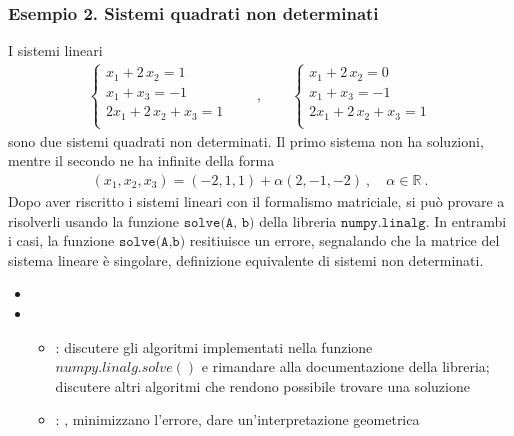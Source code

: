 \documentclass[letterpaper,10pt,english]{jupyterBook}
\begin{document}
\subsubsection{Esempio 2. Sistemi quadrati non determinati}
\label{\detokenize{ch/numerics/linear:esempio-2-sistemi-quadrati-non-determinati}}
\sphinxAtStartPar
I sistemi lineari
\begin{equation*}
\begin{split}\begin{cases}
  x_1 + 2 \, x_2 = 1 \\
  x_1 + x_3 = -1 \\
  2 x_1 + 2 \, x_2 + x_3 = 1 \\
\end{cases}
\qquad , \qquad
\begin{cases}
  x_1 + 2 \, x_2 = 0 \\
  x_1 + x_3 = -1 \\
  2 x_1 + 2 \, x_2 + x_3 = 1 \\
\end{cases}\end{split}
\end{equation*}
\sphinxAtStartPar
sono due sistemi quadrati non determinati. Il primo sistema non ha soluzioni, mentre il secondo ne ha infinite della forma
\begin{equation*}
\begin{split}(x_1, x_2, x_3) = (-2, 1, 1) + \alpha (2, -1, -2) \ , \quad \alpha \in \mathbb{R} \ .\end{split}
\end{equation*}
\sphinxAtStartPar
Dopo aver riscritto i sistemi lineari con il formalismo matriciale, si può provare a risolverli usando la funzione \(\texttt{solve(A, b)}\) della libreria \(\texttt{numpy.linalg}\). In entrambi i casi, la funzione \(\texttt{solve(A,b)}\) resitiuisce un errore, segnalando che la matrice del sistema lineare è singolare, definizione equivalente di sistemi non determinati.
\begin{itemize}
\item {} 
\sphinxAtStartPar
{} 

\item {} 
\sphinxAtStartPar
{} 
\begin{itemize}
\item {} 
\sphinxAtStartPar
{}: discutere gli algoritmi implementati nella funzione \(numpy.linalg.solve()\) e rimandare alla documentazione della libreria; discutere altri algoritmi che rendono possibile trovare una soluzione

\item {} 
\sphinxAtStartPar
{}: , minimizzano l’errore, dare un’interpretazione geometrica

\end{itemize}

\end{itemize}
\end{document}
